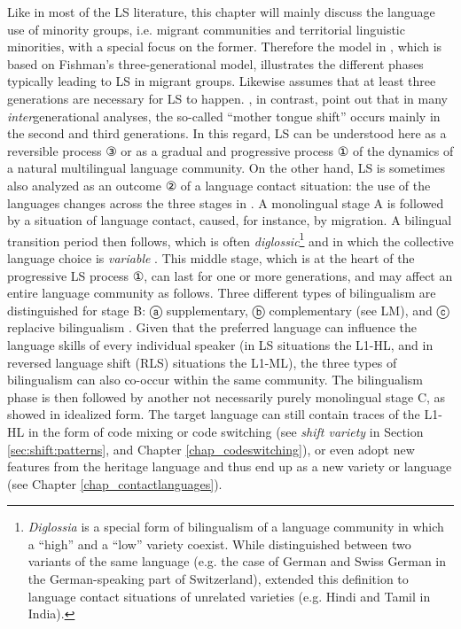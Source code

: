 \documentclass[output=paper]{langscibook}
\begin{document}
\largerpage[-1]
Like in most of the LS literature, this chapter will mainly discuss the language use of minority groups, i.e. migrant communities and territorial linguistic minorities, with a special focus on the former. Therefore the model in , which is based on Fishman's \parencite*{Fishman1964} three-generational model, illustrates the different phases typically leading to LS in migrant groups. Likewise \textcite{Weinreich1953} assumes that at least three generations are necessary for LS to happen. \textcite[6]{Ortman2008}, in contrast, point out that in many \emph{inter}generational analyses, the so-called ``mother tongue shift'' occurs mainly in the second and third generations. In this regard, LS can be understood here as a reversible process ③ or as a gradual and progressive process ① of the dynamics of a natural multilingual language community. On the other hand, LS is sometimes also analyzed as an outcome ② of a language contact situation: the use of the languages changes across the three stages in . A monolingual stage A is followed by a situation of language contact, caused, for instance, by migration. A bilingual transition period then follows, which is often \emph{diglossic}\footnote{\emph{Diglossia} is a special form of bilingualism of a language community in which a ``high'' and a ``low'' variety coexist. While \textcite{Ferguson1959} distinguished between two variants of the same language (e.g. the case of German and Swiss German in the German-speaking part of Switzerland), \textcite{Fishman1967} extended this definition to language contact situations of unrelated varieties (e.g. Hindi and Tamil in India).} and in which the collective language choice is \emph{variable} \parencite{Fasold1984}. This middle stage, which is at the heart of the progressive LS process ①, can last for one or more generations, and may affect an entire language community as follows. Three different types of bilingualism are distinguished for stage B: ⓐ supplementary, ⓑ complementary  (see LM), and ⓒ replacive bilingualism \parencite{Haugen1972}. Given that the preferred language can influence the language skills of every individual speaker (in LS situations the L1-HL, and in reversed language shift (RLS) situations the L1-ML), the three types of bilingualism can also co-occur within the same community. The bilingualism phase is then followed by another not necessarily purely monolingual stage C, as \textcite{Fishman1964} showed in idealized form. The target language can still contain traces of the L1-HL in the form of code mixing or code switching (see \emph{shift variety} in Section \ref{sec:shift:patterns}, and Chapter \ref{chap_codeswitching}), or even adopt new features from the heritage language and thus end up as a new variety or language (see Chapter \ref{chap_contactlanguages}).
\end{document}
